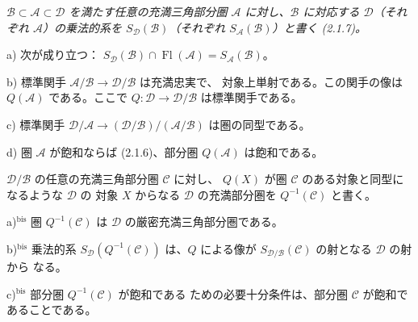 \clearpage
{}%
\begingroup
\small
\setlength{\parskip}{0pt}%
\setlength{\emergencystretch}{1.5em}%

\begingroup\itshape
{}%
$\mathcal B\subset\mathcal A\subset\mathcal D$ を満たす任意の充満三角部分圏
$\mathcal A$ に対し、$\mathcal B$ に対応する $\mathcal D$（それぞれ
$\mathcal A$）の乗法的系を $S_{\mathcal D}(\mathcal B)$（それぞれ
$S_{\mathcal A}(\mathcal B)$）と書く (2.1.7)。

\par\noindent a) 次が成り立つ：
$S_{\mathcal D}(\mathcal B)\cap\operatorname{Fl}(\mathcal A)
=S_{\mathcal A}(\mathcal B)$。

\par\noindent b) 標準関手
$\mathcal A/\mathcal B\longrightarrow\mathcal D/\mathcal B$ は充満忠実で、
対象上単射である。この関手の像は $Q(\mathcal A)$ である。ここで
$Q\colon\mathcal D\longrightarrow\mathcal D/\mathcal B$ は標準関手である。

\par\noindent c) 標準関手
$\mathcal D/\mathcal A\longrightarrow
(\mathcal D/\mathcal B)/(\mathcal A/\mathcal B)$ は圏の同型である。

\par\noindent d) 圏 $\mathcal A$ が飽和ならば (2.1.6)、部分圏
$Q(\mathcal A)$ は飽和である。

$\mathcal D/\mathcal B$ の任意の充満三角部分圏 $\mathcal C$ に対し、
$Q(X)$ が圏 $\mathcal C$ のある対象と同型になるような $\mathcal D$ の
対象 $X$ からなる $\mathcal D$ の充満部分圏を $Q^{-1}(\mathcal C)$ と書く。

\par\noindent a)$^{\mathrm{bis}}$ 圏 $Q^{-1}(\mathcal C)$ は
$\mathcal D$ の厳密充満三角部分圏である。

\par\noindent b)$^{\mathrm{bis}}$ 乗法的系
$S_{\mathcal D}(Q^{-1}(\mathcal C))$ は、$Q$ による像が
$S_{\mathcal D/\mathcal B}(\mathcal C)$ の射となる $\mathcal D$ の射から
なる。

\par\noindent c)$^{\mathrm{bis}}$ 部分圏 $Q^{-1}(\mathcal C)$ が飽和である
ための必要十分条件は、部分圏 $\mathcal C$ が飽和であることである。

